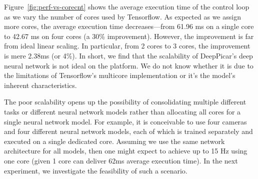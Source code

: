Figure~\ref{fig:perf-vs-corecnt} shows the average execution time of
the control loop as we vary the number of cores used by
Tensorflow. As expected as we assign more cores, the average execution
time decreases---from 61.96 ms on a single core to 42.67 ms on four
cores (a 30\% improvement). However, the improvement is far from ideal
linear scaling. In particular, from 2 cores to 3 cores, the
improvement is mere 2.38ms (or 4\%). In short, we find that the
scalability of DeepPicar's deep neural network is not ideal on the
platform. We do not know whether it is due to the limitations of
Tensorflow's multicore implementation or it's the model's inherent
characteristics. 

The poor scalability opens up the possibility of consolidating
multiple different tasks or different neural network models rather
than allocating all cores for a single neural network model. For
example, it is conceivable to use four cameras and four different
neural network models, each of which is trained separately and
executed on a single dedicated core. Assuming we use the same network
architecture for all models, then one might expect to achieve up to
15 Hz using one core (given 1 core can deliver 62ms average
execution time). In the next experiment, we investigate the
feasibility of such a scenario.



